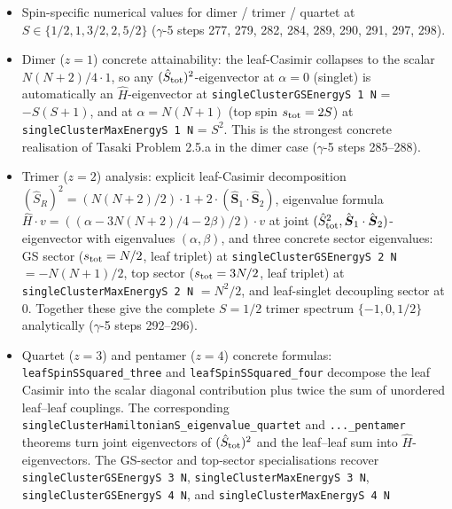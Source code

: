 \documentclass[a4paper,11pt]{article}
\begin{document}
\begin{itemize}
        gap / strict negativity ($\gamma$-5 steps 272--283).
  \item Spin-specific numerical values for dimer / trimer /
        quartet at $S \in \{1/2, 1, 3/2, 2, 5/2\}$
        ($\gamma$-5 steps 277, 279, 282, 284, 289, 290, 291,
        297, 298).
  \item Dimer ($z=1$) concrete attainability: the leaf-Casimir
        collapses to the scalar $N(N+2)/4 \cdot 1$, so any
        $(\hat S_{\rm tot})^2$-eigenvector at $\alpha = 0$
        (singlet) is automatically an $\hat H$-eigenvector at
        \texttt{singleClusterGSEnergyS 1 N} = $-S(S+1)$, and at
        $\alpha = N(N+1)$ (top spin $s_{\rm tot} = 2S$) at
        \texttt{singleClusterMaxEnergyS 1 N} = $S^2$. This is the
        strongest concrete realisation of Tasaki Problem 2.5.a in
        the dimer case ($\gamma$-5 steps 285--288).
  \item Trimer ($z=2$) analysis: explicit leaf-Casimir
        decomposition $(\hat S_R)^2 = (N(N+2)/2) \cdot 1
        + 2 \cdot (\hat{\boldsymbol S}_1 \cdot \hat{\boldsymbol S}_2)$,
        eigenvalue formula $\hat H \cdot v
        = ((\alpha - 3N(N+2)/4 - 2\beta)/2) \cdot v$ at joint
        $(\hat S_{\rm tot}^2, \hat{\boldsymbol S}_1 \cdot
        \hat{\boldsymbol S}_2)$-eigenvector with eigenvalues
        $(\alpha, \beta)$, and three concrete sector eigenvalues:
        GS sector ($s_{\rm tot} = N/2$, leaf triplet) at
        \texttt{singleClusterGSEnergyS 2 N} $= -N(N+1)/2$, top
        sector ($s_{\rm tot} = 3N/2$, leaf triplet) at
        \texttt{singleClusterMaxEnergyS 2 N} $= N^2/2$, and
        leaf-singlet decoupling sector at $0$. Together these give
        the complete $S=1/2$ trimer spectrum
        $\{-1, 0, 1/2\}$ analytically ($\gamma$-5 steps 292--296).
  \item Quartet ($z=3$) and pentamer ($z=4$) concrete formulas:
        \texttt{leafSpinSSquared\_three} and
        \texttt{leafSpinSSquared\_four} decompose the leaf Casimir
        into the scalar diagonal contribution plus twice the sum of
        unordered leaf--leaf couplings.  The corresponding
        \texttt{singleClusterHamiltonianS\_eigenvalue\_quartet}
        and \texttt{...\_pentamer} theorems turn joint eigenvectors
        of $(\hat S_{\rm tot})^2$ and the leaf--leaf sum into
        $\hat H$-eigenvectors.  The GS-sector and top-sector
        specialisations recover
        \texttt{singleClusterGSEnergyS 3 N},
        \texttt{singleClusterMaxEnergyS 3 N},
        \texttt{singleClusterGSEnergyS 4 N}, and
        \texttt{singleClusterMaxEnergyS 4 N}

\end{itemize}
\end{document}
